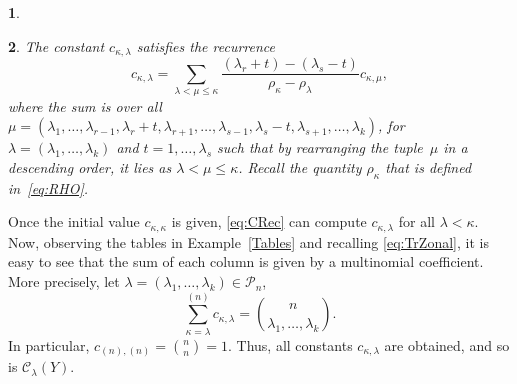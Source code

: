 \documentclass{mathincs}
\numberwithin{equation}{section}
\numberwithin{figure}{section}
\theoremstyle{plain}
\newtheorem{thm}{\protect\theoremname}[section]
\theoremstyle{definition}
\theoremstyle{remark}
\theoremstyle{plain}
\theoremstyle{definition}
\newtheorem{example}[thm]{\protect\examplename}
\theoremstyle{plain}
\theoremstyle{plain}
\providecommand{\examplename}{Example}
\providecommand{\theoremname}{Theorem}
\begin{document}
\begin{example}
\end{example}
\begin{thm}
The constant $c_{\kappa,\lambda}$ satisfies the recurrence \cite[eq.~14, p.~234]{Muirhead}
\begin{equation}\label{eq:CRec}
  c_{\kappa,\lambda} =
  \sum_{\lambda<\mu\leq\kappa}\frac{\left(\lambda_{r}+t\right)-\left(\lambda_{s}-t\right)}{\rho_{\kappa}-\rho_{\lambda}}c_{\kappa,\mu},
\end{equation}
where the sum is over all $ \mu=\left(\lambda_1,\ldots,\lambda_{r-1},\lambda_r+t,\lambda_{r+1},\ldots,
  \lambda_{s-1},\lambda_s-t,\lambda_{s+1},\ldots,\lambda_k\right)$, for $\lambda=\left(\lambda_1,\ldots,\lambda_k\right)$
and $t=1,\ldots,\lambda_s$ such that by rearranging the tuple~$\mu$
in a descending order, it lies as $\lambda<\mu\leq\kappa$. Recall the quantity
$\rho_\kappa$ that is defined in~\eqref{eq:RHO}.
\end{thm}

Once the initial value $c_{\kappa,\kappa}$ is given,
\eqref{eq:CRec} can compute $c_{\kappa,\lambda}$ for all $\lambda<\kappa$.
Now, observing the tables in Example~\ref{Tables} and recalling \eqref{eq:TrZonal},
it is easy to see that the sum of each column is given by a multinomial
coefficient. More precisely, let
$\lambda=\left(\lambda_1,\ldots,\lambda_k\right)\in\mathcal{P}_{n}$,
\begin{equation}
  \sum_{\kappa=\lambda}^{\left(n\right)}c_{\kappa,\lambda} =
  \binom{n}{\lambda_1,\ldots,\lambda_k}.\label{eq:CInitial}
\end{equation}
In particular, $c_{\left(n\right),\left(n\right)}=\binom{n}{n}=1$.
Thus, all constants $c_{\kappa,\lambda}$ are obtained, and so is $\mathcal{C}_{\lambda}(Y)$. 
\end{document}
